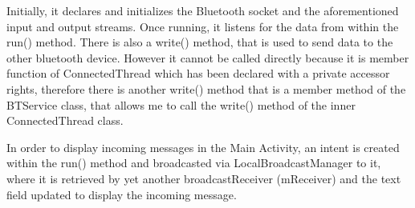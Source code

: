 \documentclass[12pt,a4paper]{article}
\begin{document}
    Initially, it declares and initializes the Bluetooth socket and the aforementioned input and output streams. Once running, it listens for the data from within the run() method. There is also a write() method, that is used to send data to the other bluetooth device. However it cannot be called directly because it is member function of ConnectedThread which has been declared with a private accessor rights, therefore there is another write() method that is a member method of the BTService class, that allows me to call the write() method of the inner ConnectedThread class.
    
    In order to display incoming messages in the Main Activity, an intent is created within the run() method and broadcasted via LocalBroadcastManager to it, where it is retrieved by yet another broadcastReceiver (mReceiver) and the text field updated to display the incoming message.
    
\end{document}
